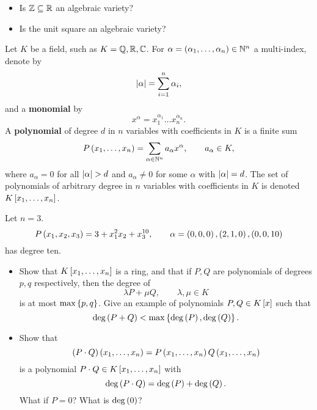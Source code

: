 \pagebreak

\begin{exercise}
\hfill
\begin{itemize}
\item Is $ \Z \subseteq \R $ an algebraic variety?
\item Is the unit square an algebraic variety?
\end{itemize}
\end{exercise}

\begin{definition}
Let $ K $ be a field, such as $ K = \Q, \R, \C $. For $ \alpha = \rb{\alpha_1, \dots, \alpha_n} \in \N^n $ a multi-index, denote by
$$ \abs{\alpha} = \sum_{i = 1}^n \alpha_i, $$
and a \textbf{monomial} by
$$ x^\alpha = x_1^{\alpha_1} \dots x_n^{\alpha_n}. $$
A \textbf{polynomial} of degree $ d $ in $ n $ variables with coefficients in $ K $ is a finite sum
$$ P\rb{x_1, \dots, x_n} = \sum_{\alpha \in \N^n} a_\alpha x^\alpha, \qquad a_\alpha \in K, $$
where $ a_\alpha = 0 $ for all $ \abs{\alpha} > d $ and $ a_\alpha \ne 0 $ for some $ \alpha $ with $ \abs{\alpha} = d $. The set of polynomials of arbitrary degree in $ n $ variables with coefficients in $ K $ is denoted $ K\sb{x_1, \dots, x_n} $.
\end{definition}

\begin{example*}
Let $ n = 3 $.
$$ P\rb{x_1, x_2, x_3} = 3 + x_1^2x_2 + x_3^{10}, \qquad \alpha = \rb{0, 0, 0}, \rb{2, 1, 0}, \rb{0, 0, 10} $$
has degree ten.
\end{example*}

\begin{exercise}
\hfill
\begin{itemize}
\item Show that $ K\sb{x_1, \dots, x_n} $ is a ring, and that if $ P, Q $ are polynomials of degrees $ p, q $ respectively, then the degree of
$$ \lambda P + \mu Q, \qquad \lambda, \mu \in K $$
is at most $ \max\cb{p, q} $. Give an example of polynomials $ P, Q \in K\sb{x} $ such that
$$ \deg\rb{P + Q} < \max\cb{\deg\rb{P}, \deg\rb{Q}}. $$
\item Show that
$$ \rb{P \cdot Q}\rb{x_1, \dots, x_n} = P\rb{x_1, \dots, x_n}Q\rb{x_1, \dots, x_n} $$
is a polynomial $ P \cdot Q \in K\sb{x_1, \dots, x_n} $ with
$$ \deg\rb{P \cdot Q} = \deg\rb{P} + \deg\rb{Q}. $$
What if $ P = 0 $? What is $ \deg\rb{0} $?
\end{itemize}
\end{exercise}

